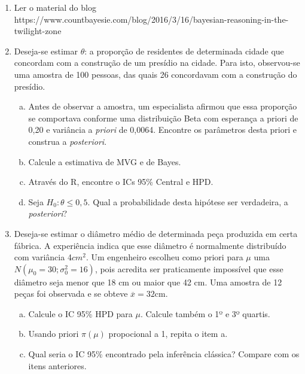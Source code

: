 \documentclass[10pt,brazil,addpoints]{exam}
\begin{document}
\begin{enumerate}[1.]
\item Ler o material do blog https://www.countbayesie.com/blog/2016/3/16/bayesian-reasoning-in-the-twilight-zone

\item  Deseja-se estimar $\theta$: a proporção de residentes de determinada cidade que concordam com a construção de um presídio na cidade. Para isto, observou-se uma amostra de 100 pessoas, das quais 26 concordavam com a construção do presídio.

\begin{enumerate}[a)]
\item Antes de observar a amostra, um especialista afirmou que essa proporção se comportava conforme uma distribuição Beta com esperança a priori de 0,20 e variância a \textit{priori} de 0,0064. Encontre os parâmetros desta priori e construa a \textit{posteriori}.

\item Calcule a estimativa de MVG e de Bayes.
\item  Através do R, encontre o ICs 95\% Central e HPD.
\item Seja $H_0 : \theta \leq  0, 5$. Qual a probabilidade desta hipótese ser verdadeira, a \textit{posteriori}?
\end{enumerate}

\item Deseja-se estimar o diâmetro médio de determinada peça produzida em certa fábrica. A experiência indica que esse diâmetro é normalmente distribuído com variância 4$cm^2$.
Um engenheiro escolheu como priori para $\mu$ uma $N(\mu_0 = 30; \sigma_0^2=16)$, pois acredita ser praticamente impossível que esse diâmetro seja menor que 18 cm ou maior que 42 cm. Uma amostra de 12 peças foi observada e se obteve $\overline{x}=32$cm.

\begin{enumerate}[a)]
    \item Calcule o IC 95\% HPD para $\mu$. Calcule também o 1º
e 3º quartis.
\item Usando priori $\pi(\mu)$ propocional a 1, repita o item a.
\item Qual seria o IC 95\% encontrado pela inferência clássica? Compare com os itens anteriores.

\end{enumerate}
\end{enumerate}
\end{document}
